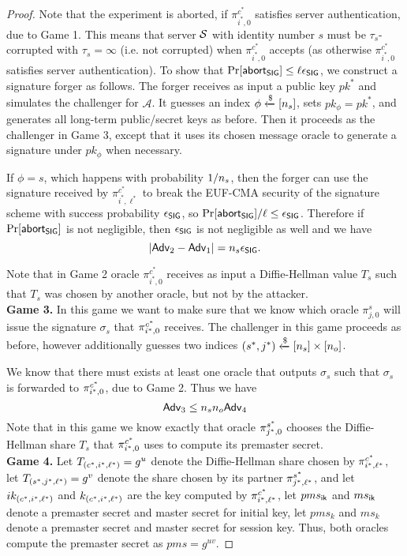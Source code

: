 \begin{proof}
 Note that the experiment is aborted, if $\pi^{c^{\ast}}_{i^{\ast},0}$ satisfies server authentication, due to Game 1. This means that server $\mathcal{S}$ with identity number $s$ must be $\tau_s$-corrupted with $\tau_s = \infty$ (i.e. not corrupted) when $\pi^{c^{\ast}}_{i^{\ast},0}$ accepts (as otherwise $\pi^{c^{\ast}}_{i^{\ast},0}$ satisfies server authentication). To show that $\Pr[\mathsf{abort}_{\mathsf{SIG}}] \leq \ell \epsilon_{\mathsf{SIG}}$, we construct a signature forger as follows. The forger receives as input a public key $pk^{\ast}$ and simulates the challenger for $\mathcal{A}$. It guesses an index $\phi \xleftarrow{\$}[n_s]$, sets $pk_{\phi} = pk^{\ast}$, and generates all long-term public/secret keys as before. Then it proceeds as the challenger in Game 3, except that it uses its chosen message oracle to generate a signature under $pk_{\phi}$ when necessary.

 If $\phi = s$, which happens with probability $1/n_s$, then the forger can use the signature received by $\pi^{c^{\ast}}_{i^{\ast},\ell^{\ast}}$ to break the EUF-CMA security of the signature scheme with success probability $\epsilon_{\mathsf{SIG}}$, so $\Pr[\mathsf{abort}_{\mathsf{SIG}}]/\ell \leq \epsilon_{\mathsf{SIG}}$. Therefore if $\Pr[\mathsf{abort}_{\mathsf{SIG}}]$ is not negligible, then $\epsilon_{\mathsf{SIG}}$ is not negligible as well and we have
 \begin{equation}
  |\mathsf{Adv}_2 - \mathsf{Adv}_1| = n_s \epsilon_{\mathsf{SIG}}.
 \end{equation}%

 Note that in Game 2 oracle $\pi^{c^{\ast}}_{i^{\ast},0}$ receives as input a Diffie-Hellman value $T_s$ such that $T_s$ was chosen by another oracle, but not by the attacker.
\vspace{10pt}\\%
%
%
 \textbf{Game 3.} In this game we want to make sure that we know which oracle $\pi^s_{j,0}$ will issue the signature $\sigma_s$ that $\pi^{c^{\ast}}_{i^{\ast},0}$ receives. The challenger in this game proceeds as before, however additionally guesses two indices $(s^{\ast}, j^{\ast}) \xleftarrow{\$} [n_s] \times [n_o]$.

 We know that there must exists at least one oracle that outputs $\sigma_s$ such that $\sigma_s$ is forwarded to $\pi^{c^{\ast}}_{i^{\ast},0}$, due to Game 2. Thus we have
 \begin{equation}
  \mathsf{Adv}_3 \leq n_s n_o \mathsf{Adv}_4
 \end{equation}%
 Note that in this game we know exactly that oracle $\pi^{s^{\ast}}_{j^{\ast},0}$ chooses the Diffie-Hellman share $T_s$ that $\pi^{c^{\ast}}_{i^{\ast},0}$ uses to compute its premaster secret.
 \vspace{10pt}\\
%
%
 \textbf{Game 4.} Let $T_{(c^{\ast}, {i^{\ast}, \ell^{\ast})}} = g^u$ denote the Diffie-Hellman share chosen by $\pi^{c^{\ast}}_{i^{\ast},\ell^{\ast}}$, let $T_{(s^{\ast}, {j^{\ast}, \ell^{\ast})}} = g^v$ denote the share chosen by its partner $\pi^{s^{\ast}}_{j^{\ast},\ell^{\ast}}$, and let $ik_{(c^{\ast}, {i^{\ast}, \ell^{\ast})}}$ and $k_{(c^{\ast}, {i^{\ast}, \ell^{\ast})}}$ are the key computed by $\pi^{c^{\ast}}_{i^{\ast},\ell^{\ast}}$, let $pms_{\mathsf{ik}}$ and $ms_{\mathsf{ik}}$ denote a premaster secret and master secret for initial key, let $pms_{k}$ and $ms_{k}$ denote a premaster secret and master secret for session key. Thus, both oracles compute the premaster secret as $pms = g^{uv}$.


\end{proof}
